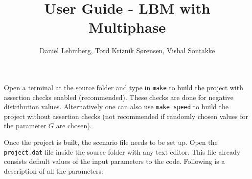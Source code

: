 \documentclass[11pt]{article}
\title{\textbf{User Guide - LBM with Multiphase}}
\author{Daniel Lehmberg, Tord Kriznik Sørensen, Vishal Sontakke}
\date{}
\begin{document}
\maketitle

Open a terminal at the source folder and type in \verb|make| to build the project with assertion checks enabled (recommended). These checks are done for negative distribution values. Alternatively one can also use \verb|make speed| to build the project without assertion checks (not recommended if randomly chosen values for the parameter $G$ are chosen).

Once the project is built, the scenario file needs to be set up. Open the \verb|project.dat| file inside the source folder with any text editor. This file already consists default values of the input parameters to the code. Following is a description of all the parameters:
\end{document}
